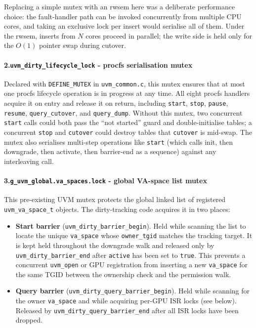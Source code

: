 \noindent
Replacing a simple mutex with an rwsem here was a deliberate performance
choice: the fault-handler path can be invoked concurrently from multiple CPU
cores, and taking an exclusive lock per insert would serialise all of them.
Under the rwsem, inserts from $N$ cores proceed in parallel; the write
side is held only for the $O(1)$ pointer swap during cutover.

\paragraph{2.\enspace\texttt{uvm\_dirty\_lifecycle\_lock} - procfs serialisation mutex}

Declared with \texttt{DEFINE\_MUTEX} in \texttt{uvm\_common.c}, this mutex
ensures that at most one procfs lifecycle operation is in progress at any
time.
All eight procfs handlers acquire it on entry and release it on return,
including \texttt{start}, \texttt{stop}, \texttt{pause}, \texttt{resume},
\texttt{query\_cutover}, and \texttt{query\_dump}.
Without this mutex, two concurrent \texttt{start} calls could both pass the
``not started'' guard and double-initialise tables; a concurrent
\texttt{stop} and \texttt{cutover} could destroy tables that \texttt{cutover}
is mid-swap.
The mutex also serialises multi-step operations like \texttt{start} (which
calls init, then downgrade, then activate, then barrier-end as a sequence)
against any interleaving call.

\paragraph{3.\enspace\texttt{g\_uvm\_global.va\_spaces.lock} - global VA-space list mutex}

This pre-existing UVM mutex protects the global linked list of registered
\texttt{uvm\_va\_space\_t} objects.
The dirty-tracking code acquires it in two places:

\begin{itemize}
    \item \textbf{Start barrier} (\texttt{uvm\_dirty\_barrier\_begin}).
          Held while scanning the list to locate the unique \texttt{va\_space}
          whose \texttt{owner\_tgid} matches the tracking target.
          It is kept held throughout the downgrade walk and released only by
          \texttt{uvm\_dirty\_barrier\_end} after \texttt{active} has been
          set to \texttt{true}.
          This prevents a concurrent \texttt{uvm\_open} or GPU registration
          from inserting a new \texttt{va\_space} for the same TGID between
          the ownership check and the permission walk.

    \item \textbf{Query barrier} (\texttt{uvm\_dirty\_query\_barrier\_begin}).
          Held while scanning for the owner \texttt{va\_space} and while
          acquiring per-GPU ISR locks (see below).
          Released by \texttt{uvm\_dirty\_query\_barrier\_end} after all ISR
          locks have been dropped.
\end{itemize}

